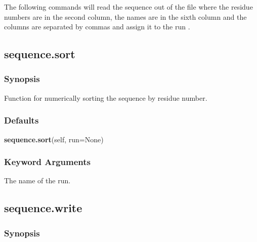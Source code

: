 




The following commands will read the sequence out of the file 
 where the
residue numbers are in the second column, the names are in the sixth column and the columns
are separated by commas and assign it to the run 
.





\newpage

\subsection{sequence.sort}


\subsubsection{Synopsis}

Function for numerically sorting the sequence by residue number.

\subsubsection{Defaults}

\textsf{\textbf{sequence.sort}(self, run=None)}


\subsubsection{Keyword Arguments}


  The name of the run.


\newpage

\subsection{sequence.write}


\subsubsection{Synopsis}

